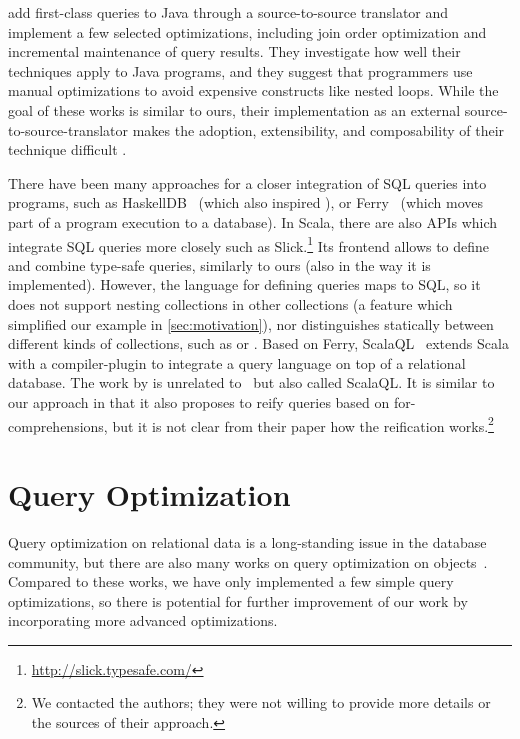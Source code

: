 \citet{Willis06JQL,Willis08} add first-class queries to Java through a source-to-source translator and implement a few selected optimizations, including join order optimization and incremental maintenance of query results.
They investigate how well their techniques apply to Java programs, and they suggest that programmers use manual optimizations to avoid expensive constructs like nested loops. While the goal of these works is similar to ours, their implementation as an external source-to-source-translator makes
the adoption, extensibility, and composability of their technique difficult%
.

There have been many approaches for a closer integration of SQL queries into programs, such as
HaskellDB~\citep{Leijen99DSEC} (which also inspired \LINQ), or Ferry~\citep{Grust:2009:FDP:1559845.1559982}
(which moves part of a program execution to a database). In Scala, there are also
APIs which integrate SQL queries more closely such as
Slick.\footnote{\url{http://slick.typesafe.com/}} Its frontend allows to define
and combine type-safe queries, similarly to ours (also in the way it is
implemented).
However, the language for defining queries maps to SQL, so it does not support nesting collections
in other collections (a feature which simplified our example in
\cref{sec:motivation}), nor distinguishes statically between different kinds of
collections, such as  or .
Based on Ferry, ScalaQL~\citep{JOT:issue_2010_07/article3} extends Scala with a compiler-plugin to integrate a query language on top of a relational database. The work by \citet{Spiewak09scalaql:language-integrated} is
 unrelated to~\citep{JOT:issue_2010_07/article3} but also called ScalaQL\@. It is similar to our approach in that it also
proposes to reify queries based on for-comprehensions, but it is not clear from their paper how the reification
works.\footnote{We contacted the authors; they were not willing to provide more details or the sources of their approach.}


\section{Query Optimization}
Query optimization on relational data is a long-standing issue in the database community, but there
are also many works on query optimization on objects~\citep{Fegaras00,Grust99PhD}.
Compared to these works, we have only implemented a few simple query optimizations, so there is potential
for further improvement of our work by incorporating more advanced optimizations.

